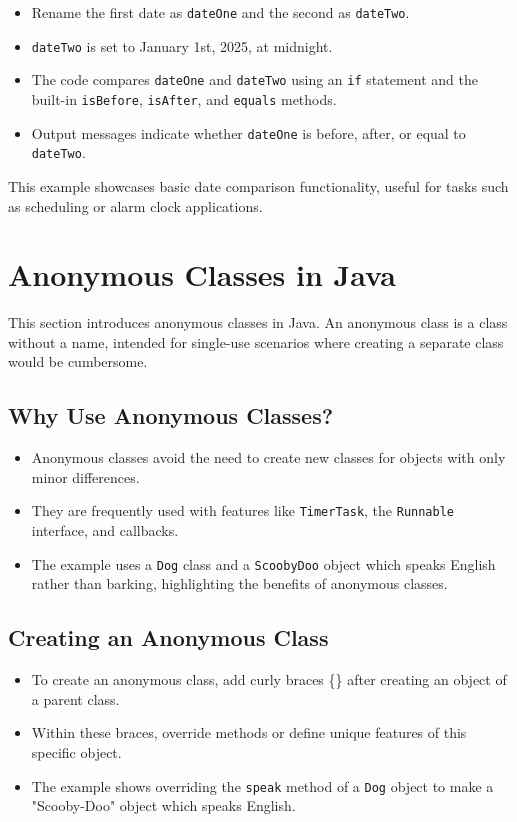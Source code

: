 \documentclass{article}
\begin{document}
\begin{itemize}
\begin{itemize}
    \item Rename the first date as \texttt{dateOne} and the second as \texttt{dateTwo}.
    \item \texttt{dateTwo} is set to January 1st, 2025, at midnight.
    \item The code compares \texttt{dateOne} and \texttt{dateTwo} using an \texttt{if} statement and the built-in \texttt{isBefore}, \texttt{isAfter}, and \texttt{equals} methods.
    \item Output messages indicate whether \texttt{dateOne} is before, after, or equal to \texttt{dateTwo}.
\end{itemize}

This example showcases basic date comparison functionality, useful for tasks such as scheduling or alarm clock applications.


\section{Anonymous Classes in Java}

This section introduces anonymous classes in Java.  An anonymous class is a class without a name, intended for single-use scenarios where creating a separate class would be cumbersome.

\subsection{Why Use Anonymous Classes?}

\begin{itemize}
    \item Anonymous classes avoid the need to create new classes for objects with only minor differences.
    \item They are frequently used with features like \texttt{TimerTask}, the \texttt{Runnable} interface, and callbacks.
    \item The example uses a \texttt{Dog} class and a \texttt{ScoobyDoo} object which speaks English rather than barking, highlighting the benefits of anonymous classes.
\end{itemize}

\subsection{Creating an Anonymous Class}

\begin{itemize}
    \item To create an anonymous class, add curly braces \{\} after creating an object of a parent class.
    \item Within these braces, override methods or define unique features of this specific object.
    \item The example shows overriding the \texttt{speak} method of a \texttt{Dog} object to make a "Scooby-Doo" object which speaks English.
\end{itemize}


\end{itemize}
\end{document}
